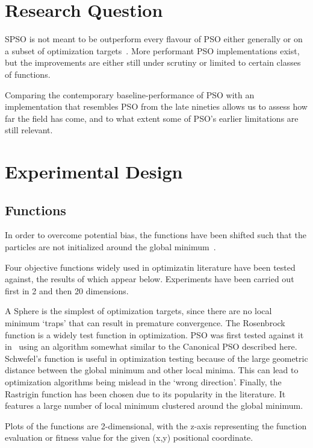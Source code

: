 \documentclass{csfourzero}
\begin{document}
\section{Research Question}

SPSO is not meant to be outperform every flavour of PSO either generally or on a
subset of optimization targets~\cite{Bratton:2007hq}. More performant PSO
implementations exist, but the improvements are either still under scrutiny or
limited to certain classes of functions.

Comparing the contemporary baseline-performance of PSO with an implementation
that resembles PSO from the late nineties allows us to assess how far the field
has come, and to what extent some of PSO's earlier limitations are still
relevant.



\section{Experimental Design}


\subsection{Functions}

In order to overcome potential bias, the functions have been shifted such that
the particles are not initialized around the global
minimum~\cite{Monson:2005fn}.

Four objective functions widely used in optimizatin literature have been tested
against, the results of which appear below. Experiments have been carried out
first in 2 and then 20 dimensions.

A Sphere is the simplest of optimization targets, since there are no local
minimum `traps' that can result in premature convergence. The Rosenbrock
function is a widely test function in optimization. PSO was first tested against
it in~\cite{Shi:1999je} using an algorithm somewhat similar to the Canonical PSO
described here. Schwefel's function is useful in optimization testing because of
the large geometric distance between the global minimum and other local minima.
This can lead to optimization algorithms being mislead in the `wrong direction'.
Finally, the Rastrigin function has been chosen due to its popularity in the
literature. It features a large number of local minimum clustered around the
global minimum.

Plots of the functions are 2-dimensional, with the z-axis representing the
function evaluation or fitness value for the given (x,y) positional coordinate.
\end{document}
